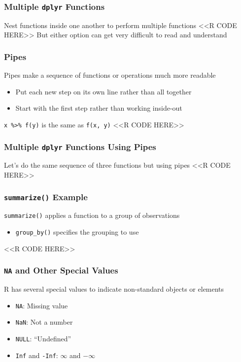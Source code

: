 \documentclass{beamer}
\begin{document}
\begin{frame}[fragile]\frametitle{Multiple \texttt{dplyr} Functions}
    Nest functions inside one another to perform multiple functions
    <<R CODE HERE>>
    \vspace{1ex}
    But either option can get very difficult to read and understand
\end{frame}

\begin{frame}[fragile]\frametitle{Pipes}
    Pipes make a sequence of functions or operations much more readable
    \begin{itemize}
        \item Put each new step on its own line rather than all together
        \item Start with the first step rather than working inside-out
    \end{itemize}
    \vspace{2ex}
    \texttt{x \%>\% f(y)} is the same as \texttt{f(x, y)}
    <<R CODE HERE>>
\end{frame}

\begin{frame}[fragile]\frametitle{Multiple \texttt{dplyr} Functions Using Pipes}
    Let's do the same sequence of three functions but using pipes
    <<R CODE HERE>>
\end{frame}

\begin{frame}[fragile]\frametitle{\texttt{summarize()} Example}
    \texttt{summarize()} applies a function to a group of observations
    \begin{itemize}
        \item \texttt{group\_by()} specifies the grouping to use
    \end{itemize}
    <<R CODE HERE>>
\end{frame}

\begin{frame}[fragile]\frametitle{\texttt{NA} and Other Special Values}
    R has several special values to indicate non-standard objects or elements
    \begin{itemize}
        \item \texttt{NA}: Missing value
        \item \texttt{NaN}: Not a number
        \item \texttt{NULL}: ``Undefined''
        \item \texttt{Inf} and \texttt{-Inf}: $\infty$ and $-\infty$
    \end{itemize}
\end{frame}
\end{document}
